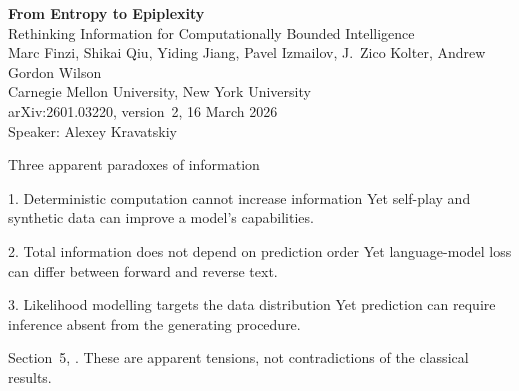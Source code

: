 \documentclass[aspectratio=169,notheorems]{beamer}
\theoremstyle{definition}
\newcommand{\src}[1]{{\scriptsize\color{black!60}#1\par}}
\begin{document}
\begin{frame}[plain]
\centering
\vspace*{1.2em}
{\LARGE\bfseries\color{myblue} From Entropy to Epiplexity}\\[0.5em]
{\large Rethinking Information for Computationally Bounded Intelligence}\\[1.8em]
Marc Finzi, Shikai Qiu, Yiding Jiang, Pavel Izmailov, J.~Zico Kolter, Andrew Gordon Wilson\\[0.2em]
{\small Carnegie Mellon University, New York University}\\[0.2em]
{\small arXiv:2601.03220, version~2, 16 March 2026}\\[2.2em]
Speaker: Alexey Kravatskiy
\end{frame}
\begin{frame}{Three apparent paradoxes of information}
\small
\begin{block}{1. Deterministic computation cannot increase information}
Yet self-play and synthetic data can improve a model's capabilities.
\end{block}
\begin{block}{2. Total information does not depend on prediction order}
Yet language-model loss can differ between forward and reverse text.
\end{block}
\begin{block}{3. Likelihood modelling targets the data distribution}
Yet prediction can require inference absent from the generating procedure.
\end{block}
\smallskip
\src{Section~5, \citet{finzi2026}. These are apparent tensions, not contradictions of the classical results.}
\end{frame}
\end{document}
